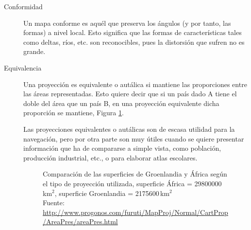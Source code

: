 \documentclass[a4paper,12pt,twoside]{article}
\begin{document}
\begin{description}
\item[Conformidad] Un mapa conforme es aquél que preserva los ángulos (y por tanto, las formas) a nivel local. Esto significa que las formas de características tales como deltas, ríos, etc. son reconocibles, pues la distorsión que sufren no es grande.
\item[Equivalencia] Una proyección es equivalente o autálica si mantiene las proporciones entre las áreas representadas. Esto quiere decir que si un país dado A tiene el doble del área que un país B, en una proyección equivalente dicha proporción se mantiene, Figura \ref{fig:groenlandia.africa.comparacion.superficies.segun.tipo.proyeccion}. 

Las proyecciones equivalentes o autálicas son de escasa utilidad para la navegación, pero por otra parte son muy útiles cuando se quiere presentar información que ha de compararse a simple vista, como población, producción industrial, etc., o para elaborar atlas escolares.


\begin{figure}[!h]
  \centering
  \caption{Comparaci\'on de las superficies de Groenlandia y \'Africa seg\'un el tipo de proyecci\'on utilizada, superficie \'Africa = 29800000\,km$^2$, superficie Groenlandia = 2175600\,km$^2$\\{\footnotesize Fuente: \url{http://www.progonos.com/furuti/MapProj/Normal/CartProp/AreaPres/areaPres.html}}
}
  \label{fig:groenlandia.africa.comparacion.superficies.segun.tipo.proyeccion}
\end{figure}



\end{description}
\end{document}
